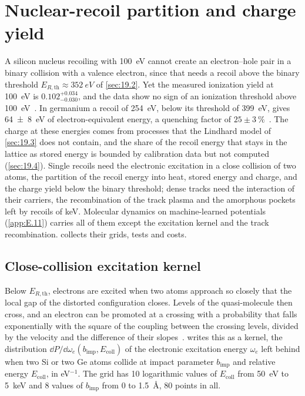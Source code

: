 \section{Nuclear-recoil partition and charge yield}\label{app:E.23}

A silicon nucleus recoiling with \SI{100}{eV} cannot create an electron--hole pair in a binary collision with a valence electron, since that needs a recoil above the binary threshold $E_{R,\mathrm{th}} \approx \SI{352}{eV}$ of \cref{sec:19.2}. Yet the measured ionization yield at \SI{100}{eV} is $0.102^{+0.034}_{-0.030}$, and the data show no sign of an ionization threshold above \SI{100}{eV}~\cite[Table~II]{albakry2023first}. In germanium a recoil of \SI{254}{eV}, below its threshold of \SI{399}{eV}, gives \SI{64 \pm 8}{eV} of electron-equivalent energy, a quenching factor of $25\pm\SI{3}{\percent}$~\cite{kavner2024measurement}. The charge at these energies comes from processes that the Lindhard model of \cref{sec:19.3} does not contain, and the share of the recoil energy that stays in the lattice as stored energy is bounded by calibration data but not computed (\cref{sec:19.4}). Single recoils need the electronic excitation in a close collision of two atoms, the partition of the recoil energy into heat, stored energy and charge, and the charge yield below the binary threshold; dense tracks need the interaction of their carriers, the recombination of the track plasma and the amorphous pockets left by recoils of keV. Molecular dynamics on machine-learned potentials (\cref{app:E.11}) carries all of them except the excitation kernel and the track recombination.  collects their grids, tests and costs.

\subsection{Close-collision excitation kernel}

Below $E_{R,\mathrm{th}}$, electrons are excited when two atoms approach so closely that the local gap of the distorted configuration closes. Levels of the quasi-molecule then cross, and an electron can be promoted at a crossing with a probability that falls exponentially with the square of the coupling between the crossing levels, divided by the velocity and the difference of their slopes~\cite{zener1932non,vutha2010simple}.  writes this as a kernel, the distribution $\dd P/\dd\omega_e(b_{\mathrm{imp}}, E_{\mathrm{coll}})$ of the electronic excitation energy $\omega_e$ left behind when two Si or two Ge atoms collide at impact parameter $b_{\mathrm{imp}}$ and relative energy $E_{\mathrm{coll}}$, in eV$^{-1}$. The grid has 10 logarithmic values of $E_{\mathrm{coll}}$ from \SI{50}{eV} to \SI{5}{keV} and 8 values of $b_{\mathrm{imp}}$ from 0 to \SI{1.5}{\angstrom}, 80 points in all.

